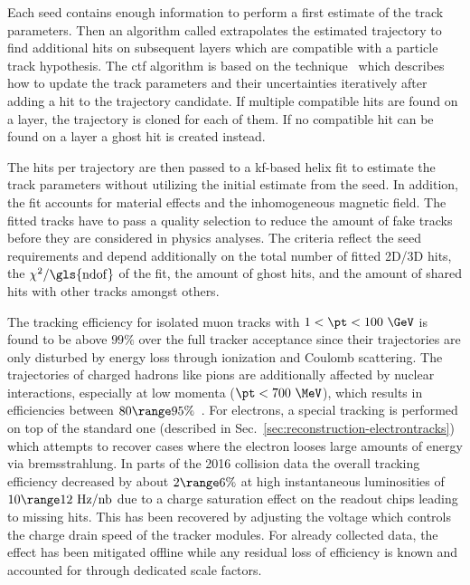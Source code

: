 Each seed contains enough information to perform a first estimate of the track parameters. Then an algorithm called  extrapolates the estimated trajectory to find additional hits on subsequent layers which are compatible with a particle track hypothesis. The \gls{ctf} algorithm is based on the  technique~\cite{Fruhwirth:1987fm,Billoir:1989mh,BILLOIR1990219} which describes how to update the track parameters and their uncertainties iteratively after adding a hit to the trajectory candidate. If multiple compatible hits are found on a layer, the trajectory is cloned for each of them. If no compatible hit can be found on a layer a ghost hit is created instead.

The hits per trajectory are then passed to a \gls{kf}-based helix fit to estimate the track parameters without utilizing the initial estimate from the seed. In addition, the fit accounts for material effects and the inhomogeneous magnetic field.  The fitted tracks have to pass a quality selection to reduce the amount of fake tracks before they are considered in physics analyses. The criteria reflect the seed requirements and depend additionally on the total number of fitted 2D/3D hits, the $\chi^2/\mathrm{\gls{ndof}}$ of the fit, the amount of ghost hits, and the amount of shared hits with other tracks amongst others.

The tracking efficiency for isolated muon tracks with $1<\pt<100~\GeV$ is found to be above $99\%$ over the full tracker acceptance since their trajectories are only disturbed by energy loss through ionization and Coulomb scattering. The trajectories of charged hadrons like pions are additionally affected by nuclear interactions, especially at low momenta ($\pt<700~\MeV$), which results in efficiencies between $80\range95\%$~\cite{Chatrchyan:2014fea}. For electrons, a special tracking is performed on top of the standard one (described in Sec.~\ref{sec:reconstruction-electrontracks}) which attempts to recover cases where the electron looses large amounts of energy via bremsstrahlung. In parts of the 2016 collision data the overall tracking efficiency decreased by about $2\range6\%$ at high instantaneous luminosities of $10\range12~\mathrm{Hz/nb}$ due to a charge saturation effect on the readout chips leading to missing hits. This has been recovered by adjusting the voltage which controls the charge drain speed of the tracker modules. For already collected data, the effect has been mitigated offline while any residual loss of efficiency is known and accounted for through dedicated scale factors.

